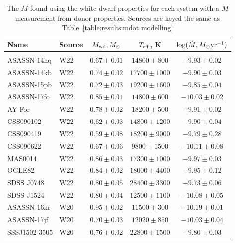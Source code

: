 \begin{table}
    \centering
    \caption{The $\dot M$ found using the white dwarf properties for each system with a $\dot M$ measurement from donor properties. Sources are keyed the same as Table~\ref{table:results:mdot modelling}}
    \label{table:results:Mdot from white dwarf parameters}
    \begin{tabular}{llccc}
        \hline
        \textbf{Name} & \textbf{Source} & \textbf{$M_{\rm wd}, M_\odot$} & \textbf{$T_{\rm eff}$, K} & \textbf{$\log (\dot M, M_\odot {\rm yr}^{-1})$} \\
        \hline \hline \\
        ASASSN-14hq      &  W22  & $0.67 \pm 0.01$ & $14800\pm   800$ & $ -9.93 \pm 0.02$ \\
        ASASSN-14kb      &  W22  & $0.74 \pm 0.02$ & $17700\pm  1000$ & $ -9.90 \pm 0.03$ \\
        ASASSN-15pb      &  W22  & $0.72 \pm 0.03$ & $19200\pm  1600$ & $ -9.85 \pm 0.04$ \\
        ASASSN-17fo      &  W22  & $0.85 \pm 0.01$ & $14800\pm   600$ & $-10.03 \pm 0.02$ \\
        AY For           &  W22  & $0.78 \pm 0.02$ & $18200\pm   500$ & $ -9.91 \pm 0.02$ \\
        CSS090102        &  W22  & $0.62 \pm 0.03$ & $14800\pm  1200$ & $ -9.90 \pm 0.04$ \\
        CSS090419        &  W22  & $0.59 \pm 0.08$ & $18200\pm  9000$ & $ -9.79 \pm 0.28$ \\
        CSS090622        &  W22  & $0.67 \pm 0.06$ & $ 9800\pm  1500$ & $-10.11 \pm 0.08$ \\
        MAS0014          &  W22  & $0.86 \pm 0.03$ & $17300\pm  1000$ & $ -9.97 \pm 0.03$ \\
        OGLE82           &  W22  & $0.84 \pm 0.02$ & $18000\pm  4400$ & $ -9.95 \pm 0.12$ \\
        SDSS J0748       &  W22  & $0.80 \pm 0.05$ & $28400\pm  3300$ & $ -9.73 \pm 0.06$ \\
        SDSS J1524       &  W22  & $0.80 \pm 0.04$ & $12500\pm  1100$ & $-10.08 \pm 0.05$ \\
        ASASSN-16kr      &  W20  & $0.95 \pm 0.02$ & $11500\pm   300$ & $-10.19 \pm 0.01$ \\
        ASASSN-17jf      &  W20  & $0.70 \pm 0.03$ & $12020\pm   850$ & $-10.03 \pm 0.04$ \\
        SSSJ1502-3505    &  W20  & $0.76 \pm 0.02$ & $22800\pm  1500$ & $ -9.80 \pm 0.03$ \\

\end{tabular}
\end{table}
